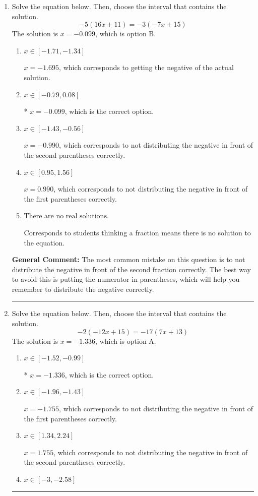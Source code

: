 \documentclass{extbook}[14pt]
\newcommand{\litem}[1]{\item #1

\rule{\textwidth}{0.4pt}}
\begin{document}
\begin{enumerate}\litem{
Solve the equation below. Then, choose the interval that contains the solution.
\[ -5(16x + 11) = -3(-7x + 15) \]
The solution is \( x = -0.099 \), which is option B.\begin{enumerate}[label=\Alph*.]
\item \( x \in [-1.71, -1.34] \)

$x = -1.695$, which corresponds to getting the negative of the actual solution.
\item \( x \in [-0.79, 0.08] \)

* $x = -0.099$, which is the correct option.
\item \( x \in [-1.43, -0.56] \)

$x = -0.990$, which corresponds to not distributing the negative in front of the second parentheses correctly.
\item \( x \in [0.95, 1.56] \)

$x = 0.990$, which corresponds to not distributing the negative in front of the first parentheses correctly.
\item \( \text{There are no real solutions.} \)

Corresponds to students thinking a fraction means there is no solution to the equation.
\end{enumerate}

\textbf{General Comment:} The most common mistake on this question is to not distribute the negative in front of the second fraction correctly. The best way to avoid this is putting the numerator in parentheses, which will help you remember to distribute the negative correctly.
}
\litem{
Solve the equation below. Then, choose the interval that contains the solution.
\[ -2(-12x + 15) = -17(7x + 13) \]
The solution is \( x = -1.336 \), which is option A.\begin{enumerate}[label=\Alph*.]
\item \( x \in [-1.52, -0.99] \)

* $x = -1.336$, which is the correct option.
\item \( x \in [-1.96, -1.43] \)

$x = -1.755$, which corresponds to not distributing the negative in front of the first parentheses correctly.
\item \( x \in [1.34, 2.24] \)

$x = 1.755$, which corresponds to not distributing the negative in front of the second parentheses correctly.
\item \( x \in [-3, -2.58] \)


\end{enumerate}}
\end{enumerate}
\end{document}
